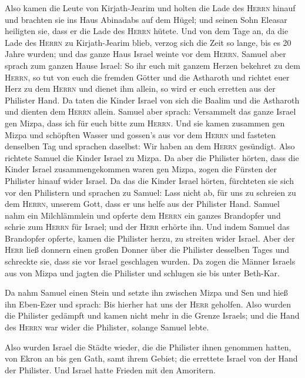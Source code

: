  Also kamen die Leute von Kirjath-Jearim und holten die
Lade des \textsc{Herrn} hinauf und brachten sie ins Haus Abinadabs auf
dem Hügel; und seinen Sohn Eleasar heiligten sie, dass er die Lade des
\textsc{Herrn} hütete.  Und von dem Tage an, da die Lade
des \textsc{Herrn} zu Kirjath-Jearim blieb, verzog sich die Zeit so
lange, bis es 20 Jahre wurden; und das ganze Haus Israel weinte vor dem
\textsc{Herrn}.  Samuel aber sprach zum ganzen Hause
Israel: So ihr euch mit ganzem Herzen bekehret zu dem \textsc{Herrn}, so
tut von euch die fremden Götter und die Astharoth und richtet euer Herz
zu dem \textsc{Herrn} und dienet ihm allein, so wird er euch erretten
aus der Philister Hand.  Da taten die Kinder Israel von
sich die Baalim und die Astharoth und dienten dem \textsc{Herrn} allein.
 Samuel aber sprach: Versammelt das ganze Israel gen
Mizpa, dass ich für euch bitte zum \textsc{Herrn}.  Und
sie kamen zusammen gen Mizpa und schöpften Wasser und gossen's aus vor
dem \textsc{Herrn} und fasteten denselben Tag und sprachen daselbst: Wir
haben an dem \textsc{Herrn} gesündigt. Also richtete Samuel die Kinder
Israel zu Mizpa.  Da aber die Philister hörten, dass die
Kinder Israel zusammengekommen waren gen Mizpa, zogen die Fürsten der
Philister hinauf wider Israel. Da das die Kinder Israel hörten,
fürchteten sie sich vor den Philistern  und sprachen zu
Samuel: Lass nicht ab, für uns zu schreien zu dem \textsc{Herrn},
unserem Gott, dass er uns helfe aus der Philister Hand. 
Samuel nahm ein Milchlämmlein und opferte dem \textsc{Herrn} ein ganzes
Brandopfer und schrie zum \textsc{Herrn} für Israel; und der
\textsc{Herr} erhörte ihn.  Und indem Samuel das
Brandopfer opferte, kamen die Philister herzu, zu streiten wider Israel.
Aber der \textsc{Herr} ließ donnern einen großen Donner über die
Philister desselben Tages und schreckte sie, dass sie vor Israel
geschlagen wurden.  Da zogen die Männer Israels aus von
Mizpa und jagten die Philister und schlugen sie bis unter Beth-Kar.

 Da nahm Samuel einen Stein und setzte ihn zwischen Mizpa
und Sen und hieß ihn Eben-Ezer und sprach: Bis hierher hat uns der
\textsc{Herr} geholfen.  Also wurden die Philister
gedämpft und kamen nicht mehr in die Grenze Israels; und die Hand des
\textsc{Herrn} war wider die Philister, solange Samuel lebte.

 Also wurden Israel die Städte wieder, die die Philister
ihnen genommen hatten, von Ekron an bis gen Gath, samt ihrem Gebiet; die
errettete Israel von der Hand der Philister. Und Israel hatte Frieden
mit den Amoritern.

